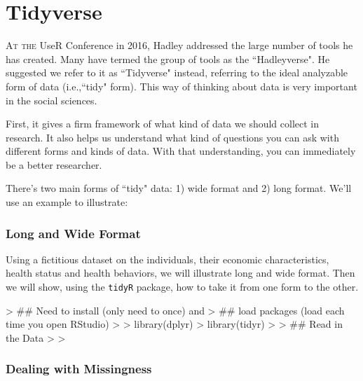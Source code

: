 \documentclass{book}
\begin{document}
\chapter{Tidyverse}
\label{ch_tidy}

\textsc{At the} UseR Conference in 2016, Hadley addressed the large number of tools he has created. Many have termed the group of tools as the ``Hadleyverse". He suggested we refer to it as ``Tidyverse" instead, referring to the ideal analyzable form of data (i.e.,``tidy" form). This way of thinking about data is very important in the social sciences.

First, it gives a firm framework of what kind of data we should collect in research. It also helps us understand what kind of questions you can ask with different forms and kinds of data. With that understanding, you can immediately be a better researcher.

There's two main forms of ``tidy" data: 1) wide format and 2) long format. We'll use an example to illustrate:

\subsection*{Long and Wide Format}

Using a fictitious dataset on the individuals, their economic characteristics, health status and health behaviors, we will illustrate long and wide format. Then we will show, using the \texttt{tidyR} package, how to take it from one form to the other.

\begin{Schunk}
\begin{Sinput}
> ## Need to install (only need to once) and 
> ##   load packages (load each time you open RStudio)
> 
> library(dplyr)
> library(tidyr)
> 
> ## Read in the Data
> 
> 
\end{Sinput}
\end{Schunk}


\subsection*{Dealing with Missingness}




\subsection*{}
\end{document}
